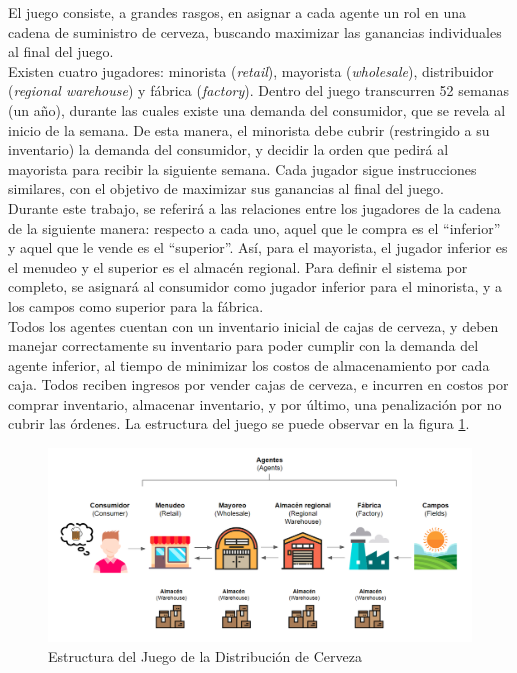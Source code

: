 El juego consiste, a grandes rasgos, en asignar a cada agente un rol en una cadena de suministro de cerveza, buscando maximizar las ganancias individuales al final del juego.\\

Existen cuatro jugadores: minorista (\textit{retail}), mayorista (\textit{wholesale}), distribuidor (\textit{regional warehouse}) y f\'abrica (\textit{factory}). Dentro del juego transcurren 52 semanas (un a\~no), durante las cuales existe una demanda del consumidor, que se revela al inicio de la semana. De esta manera, el minorista debe cubrir (restringido a su inventario) la demanda del consumidor, y decidir la orden que pedir\'a al mayorista para recibir la siguiente semana. Cada jugador sigue instrucciones similares, con el objetivo de maximizar sus ganancias al final del juego.\\

Durante este trabajo, se referir\'a a las relaciones entre los jugadores de la cadena de la siguiente manera: respecto a cada uno, aquel que le compra es el ``inferior'' y aquel que le vende es el ``superior''. As\'i, para el mayorista, el jugador inferior es el menudeo y el superior es el almac\'en regional. Para definir el sistema por completo, se asignar\'a al consumidor como jugador inferior para el minorista, y a los campos como superior para la f\'abrica.\\

Todos los agentes cuentan con un inventario inicial de cajas de cerveza, y deben manejar correctamente su inventario para poder cumplir con la demanda del agente inferior, al tiempo de minimizar los costos de almacenamiento por cada caja. Todos reciben ingresos por vender cajas de cerveza, e incurren en costos por comprar inventario, almacenar inventario, y por \'ultimo, una penalizaci\'on por no cubrir las \'ordenes. La estructura del juego se puede observar en la figura \ref{structure}.\\


\begin{figure}[ht]
\label{structure}
\includegraphics[width=15cm]{tesis_tex/figs/beer_distribution_game_structure.PNG}
\caption[Estructura del Juego de la Distribución de Cerveza]{Estructura del Juego de la Distribución de Cerveza\protect\footnotemark}
\centering
\end{figure}

